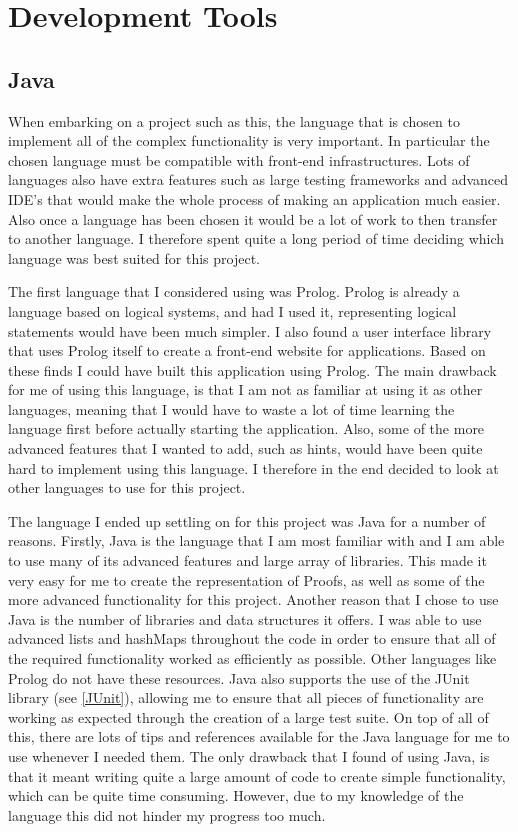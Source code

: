 \section{Development Tools}

\subsection{Java}

When embarking on a project such as this, the language that is chosen to implement all of the complex functionality is very important. In particular the chosen language must be compatible with front-end infrastructures. Lots of languages also have extra features such as large testing frameworks and advanced IDE's that would make the whole process of making an application much easier. Also once a language has been chosen it would be a lot of work to then transfer to another language. I therefore spent quite a long period of time deciding which language was best suited for this project.

The first language that I considered using was Prolog. Prolog is already a language based on logical systems, and had I used it, representing logical statements would have been much simpler. I also found a user interface library that uses Prolog itself to create a front-end website for applications. Based on these finds I could have built this application using Prolog. The main drawback for me of using this language, is that I am not as familiar at using it as other languages, meaning that I would have to waste a lot of time learning the language first before actually starting the application. Also, some of the more advanced features that I wanted to add, such as hints, would have been quite hard to implement using this language. I therefore in the end decided to look at other languages to use for this project. 

The language I ended up settling on for this project was Java for a number of reasons. Firstly, Java is the language that I am most familiar with and I am able to use many of its advanced features and large array of libraries. This made it very easy for me to create the representation of Proofs, as well as some of the more advanced functionality for this project. Another reason that I chose to use Java is the number of libraries and data structures it offers. I was able to use advanced lists and hashMaps throughout the code in order to ensure that all of the required functionality worked as efficiently as possible. Other languages like Prolog do not have these resources. Java also supports the use of the JUnit library (see \ref{JUnit}), allowing me to ensure that all pieces of functionality are working as expected through the creation of a large test suite. On top of all of this, there are lots of tips and references available for the Java language for me to use whenever I needed them. The only drawback that I found of using Java, is that it meant writing quite a large amount of code to create simple functionality, which can be quite time consuming. However, due to my knowledge of the language this did not hinder my progress too much. 


